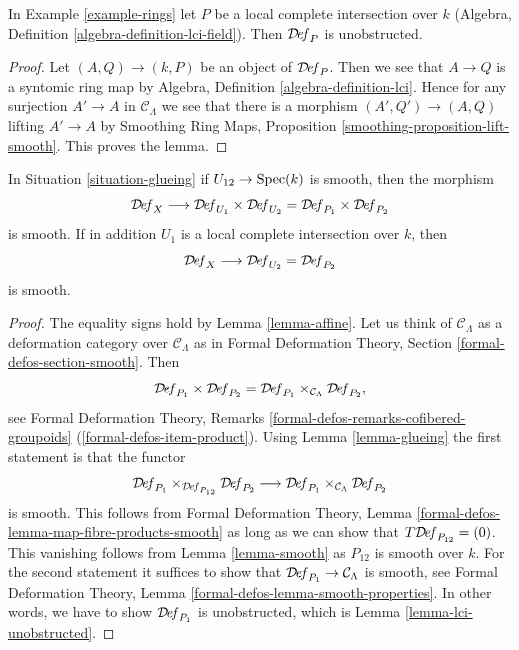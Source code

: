\begin{lemma}
\label{lemma-lci-unobstructed}
In Example \ref{example-rings} let $P$ be a local complete
intersection over $k$ (Algebra, Definition \ref{algebra-definition-lci-field}).
Then $\mathcal{D}\!\mathit{ef}_P$ is unobstructed.
\end{lemma}

\begin{proof}
Let $(A, Q) \to (k, P)$ be an object of $\mathcal{D}\!\mathit{ef}_P$.
Then we see that $A \to Q$ is a syntomic ring map by
Algebra, Definition \ref{algebra-definition-lci}.
Hence for any surjection $A' \to A$ in $\mathcal{C}_\Lambda$
we see that there is a morphism $(A', Q') \to (A, Q)$
lifting $A' \to A$ by
Smoothing Ring Maps, Proposition \ref{smoothing-proposition-lift-smooth}.
This proves the lemma.
\end{proof}

\begin{lemma}
\label{lemma-glueing-smooth}
In Situation \ref{situation-glueing} if $U_{12} \to \mathop{\mathrm{Spec}}(k)$ is smooth,
then the morphism
$$
\mathcal{D}\!\mathit{ef}_X
\longrightarrow
\mathcal{D}\!\mathit{ef}_{U_1} \times \mathcal{D}\!\mathit{ef}_{U_2} =
\mathcal{D}\!\mathit{ef}_{P_1} \times \mathcal{D}\!\mathit{ef}_{P_2}
$$
is smooth. If in addition
$U_1$ is a local complete intersection over $k$, then
$$
\mathcal{D}\!\mathit{ef}_X
\longrightarrow
\mathcal{D}\!\mathit{ef}_{U_2} = \mathcal{D}\!\mathit{ef}_{P_2}
$$
is smooth.
\end{lemma}

\begin{proof}
The equality signs hold by Lemma \ref{lemma-affine}.
Let us think of $\mathcal{C}_\Lambda$ as a deformation
category over $\mathcal{C}_\Lambda$ as in
Formal Deformation Theory, Section \ref{formal-defos-section-smooth}.
Then
$$
\mathcal{D}\!\mathit{ef}_{P_1} \times \mathcal{D}\!\mathit{ef}_{P_2} =
\mathcal{D}\!\mathit{ef}_{P_1}
\times_{\mathcal{C}_\Lambda}
\mathcal{D}\!\mathit{ef}_{P_2},
$$
see Formal Deformation Theory, Remarks
\ref{formal-defos-remarks-cofibered-groupoids}
(\ref{formal-defos-item-product}).
Using
Lemma \ref{lemma-glueing}
the first statement is that the functor
$$
\mathcal{D}\!\mathit{ef}_{P_1}
\times_{\mathcal{D}\!\mathit{ef}_{P_{12}}}
\mathcal{D}\!\mathit{ef}_{P_2}
\longrightarrow
\mathcal{D}\!\mathit{ef}_{P_1}
\times_{\mathcal{C}_\Lambda}
\mathcal{D}\!\mathit{ef}_{P_2}
$$
is smooth. This follows from Formal Deformation Theory, Lemma
\ref{formal-defos-lemma-map-fibre-products-smooth} as long as
we can show that $T\mathcal{D}\!\mathit{ef}_{P_{12}} = (0)$.
This vanishing follows from Lemma \ref{lemma-smooth}
as $P_{12}$ is smooth over $k$.
For the second statement it suffices to show that
$\mathcal{D}\!\mathit{ef}_{P_1} \to \mathcal{C}_\Lambda$
is smooth, see Formal Deformation Theory, Lemma
\ref{formal-defos-lemma-smooth-properties}.
In other words, we have to show $\mathcal{D}\!\mathit{ef}_{P_1}$
is unobstructed, which is Lemma \ref{lemma-lci-unobstructed}.
\end{proof}

